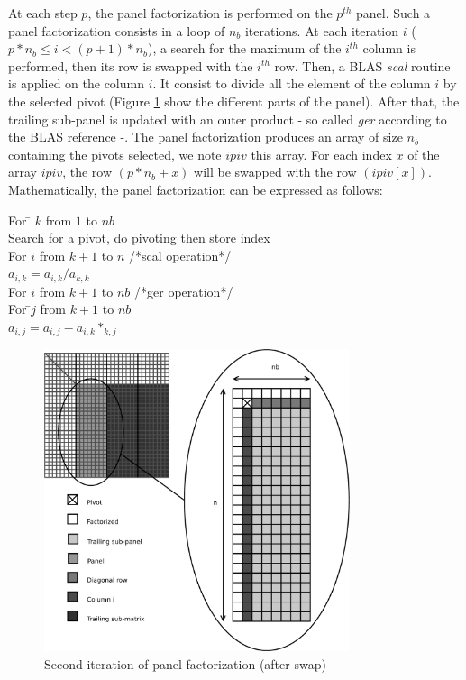  
At each step $p$, the panel factorization is performed on the $p^{th}$ panel. Such a panel factorization consists in a loop of $n_b$ iterations. At each iteration $i$ ($p*n_b \leq i < (p+1)*n_b$), a search for the maximum of the $i^{th}$ column is performed, then its row is swapped with the $i^{th}$ row.
Then, a BLAS \textit{scal} routine is applied on the column $i$. It consist to divide all the element of the column $i$ by the selected pivot (Figure \ref{fig:panel} show the different parts of the panel).
After that, the trailing sub-panel is updated with an outer product - so called \textit{ger} according to the BLAS reference -. The panel factorization produces an array of size $n_b$ containing the pivots selected, we note $ipiv$ this array. For each index $x$ of the array $ipiv$, the row $(p*n_b + x)$ will be swapped with the row $(ipiv[x])$.
Mathematically, the panel factorization can be expressed as follows:\\
\begin{tabbing}
For \= $k$ from $1$ to $nb$\\
\> Search for a pivot, do pivoting then store index\\
\> For \=$i$ from $k+1$ to $n$    /*scal operation*/\\
\>\> $a_{i,k} = a_{i,k}/a_{k,k}$\\
\> For \=$i$ from $k+1$ to $nb$   /*ger operation*/\\
\>\> For \=$j$ from $k+1$ to $nb$\\
\>\>\> $a_{i,j} = a_{i,j}-a_{i,k}*_{k,j}$\\
\end{tabbing}

\begin{figure}[!ht]
\centering
\includegraphics[width=0.8\textwidth]{figures/panel.pdf}
\caption{Second iteration of panel factorization (after swap)\label{fig:panel}}
\end{figure}

